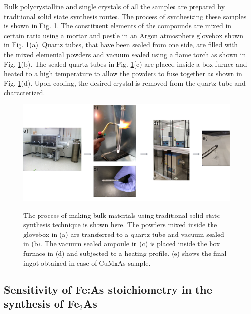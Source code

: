 \documentclass[10pt,doublespacing,edeposit]{uiucthesis2020}
\begin{document}
\begin{mainmatter}

Bulk polycrystalline and single crystals of all the samples are prepared by traditional solid state synthesis routes. The process of synthesizing these samples is shown in Fig. \ref{fig:synthesis_procedure}. The constituent elements of the compounds are mixed in certain ratio using a mortar and pestle in an Argon atmosphere glovebox shown in Fig. \ref{fig:synthesis_procedure}(a). Quartz tubes, that have been sealed from one side, are filled with the mixed elemental powders and vacuum sealed using a flame torch as shown in Fig. \ref{fig:synthesis_procedure}(b). The sealed quartz tubes in Fig. \ref{fig:synthesis_procedure}(c) are placed inside a box furnce and heated to a high temperature to allow the powders to fuse together as shown in Fig. \ref{fig:synthesis_procedure}(d). Upon cooling, the desired crystal is removed from the quartz tube and characterized.

\begin{figure}
\centering\includegraphics[width=\columnwidth]{figures/ch3/synthesis_procedure.png} \\
\caption{\label{fig:synthesis_procedure}
The process of making bulk materials using traditional solid state synthesis technique is shown here. The powders mixed inside the glovebox in (a) are transferred to a quartz tube and vacuum sealed in (b). The vacuum sealed ampoule in (c) is placed inside the box furnace in (d) and subjected to a heating profile. (e) shows the final ingot obtained in case of CuMnAs sample.
}
\end{figure}



\subsection{Sensitivity of Fe:As stoichiometry in the synthesis of Fe$_2$As}


\end{mainmatter}
\end{document}
